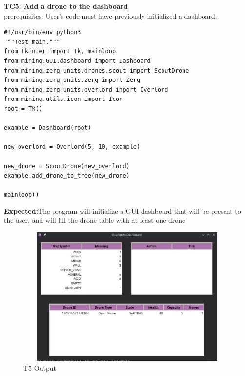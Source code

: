\documentclass{article}
\begin{document}
\newpage
\Large\textbf{TC5: Add a drone to the dashboard}\\
\indent\large{prerequisites: User's code must have previously initialized a dashboard.}\\
\begin{lstlisting}
#!/usr/bin/env python3
"""Test main."""
from tkinter import Tk, mainloop
from mining.GUI.dashboard import Dashboard
from mining.zerg_units.drones.scout import ScoutDrone
from mining.zerg_units.zerg import Zerg
from mining.zerg_units.overlord import Overlord
from mining.utils.icon import Icon
root = Tk()

example = Dashboard(root)

new_overlord = Overlord(5, 10, example)

new_drone = ScoutDrone(new_overlord)
example.add_drone_to_tree(new_drone)

mainloop()
\end{lstlisting}
\begin{description}
    \textbf{Expected:}{The program will initialize a GUI dashboard that will be present to the user, and will fill the drone table with at least one drone}
    \begin{figure}[htp]
    \includegraphics[width=15cm, height=7cm]{testcase5.png}
    
    \caption{T5 Output}
    \label{fig:galaxy}
\end{figure}
\end{description}
\end{document}
